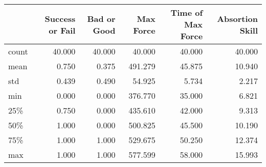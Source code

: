 \begin{tabular}{lrrrrr}
\toprule
{} &  Success or Fail &  Bad or Good &  Max Force &  Time of Max Force &  Absortion Skill \\
\midrule
count &           40.000 &       40.000 &     40.000 &             40.000 &           40.000 \\
mean  &            0.750 &        0.375 &    491.279 &             45.875 &           10.940 \\
std   &            0.439 &        0.490 &     54.925 &              5.734 &            2.217 \\
min   &            0.000 &        0.000 &    376.770 &             35.000 &            6.821 \\
25\%   &            0.750 &        0.000 &    435.610 &             42.000 &            9.313 \\
50\%   &            1.000 &        0.000 &    500.825 &             45.500 &           10.190 \\
75\%   &            1.000 &        1.000 &    529.675 &             50.250 &           12.374 \\
max   &            1.000 &        1.000 &    577.599 &             58.000 &           15.993 \\
\bottomrule
\end{tabular}
